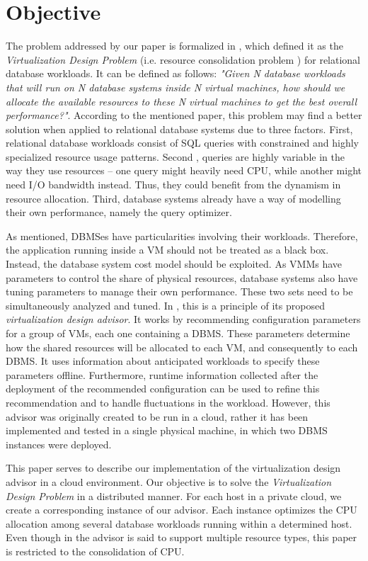 \section{Objective}

The problem addressed by our paper is formalized in \cite{4401021}, which defined it as the \textit{Virtualization Design Problem} (i.e. resource consolidation problem ) for relational database workloads. It can be defined as follows: \textit{"Given N database workloads that will run on N database systems inside N virtual 
machines, how should we allocate the available resources to these N virtual machines to get the best overall performance?"}. According to the mentioned paper, this problem may find a better solution when applied to relational database systems due to three factors. First, relational database workloads consist of SQL queries with constrained and highly specialized resource usage patterns. Second , queries are highly variable in the way they use resources -- one query might heavily need CPU, while another might need I/O bandwidth instead. Thus, they could benefit from the dynamism in resource allocation. Third, database systems already have a way of modelling their own performance, namely the query optimizer.

As mentioned, DBMSes have particularities involving their workloads. Therefore, the application running inside a VM should not be treated as a black box. Instead, the database system cost model should be exploited. As VMMs have parameters to control the share of physical resources, database systems also have tuning parameters to manage their own performance. These two sets need to be simultaneously analyzed and tuned. In \cite{Soror:2008:AVM:1376616.1376711}, this is a principle of its proposed \textit{virtualization design advisor}. It works by recommending configuration parameters for a group of VMs, each one containing a DBMS. These parameters determine how the shared resources will be allocated to each VM, and consequently to each DBMS. It uses information about anticipated workloads to specify these parameters offline. Furthermore, runtime information collected after the deployment of the recommended configuration can be used to refine this recommendation and to handle fluctuations in the workload. However, this advisor was originally created to be run in a cloud, rather it has been implemented and tested in a single physical machine, in which two DBMS instances were deployed.

This paper serves to describe our implementation of the virtualization design advisor in a cloud environment. Our objective is to solve the \textit{Virtualization Design Problem} in a distributed manner. For each host in a private cloud, we create a corresponding instance of our advisor. Each instance optimizes the CPU allocation among several database workloads running within a determined host. Even though in \cite{Soror:2008:AVM:1376616.1376711} the advisor is said to support multiple resource types, this paper is restricted to the consolidation of CPU.

